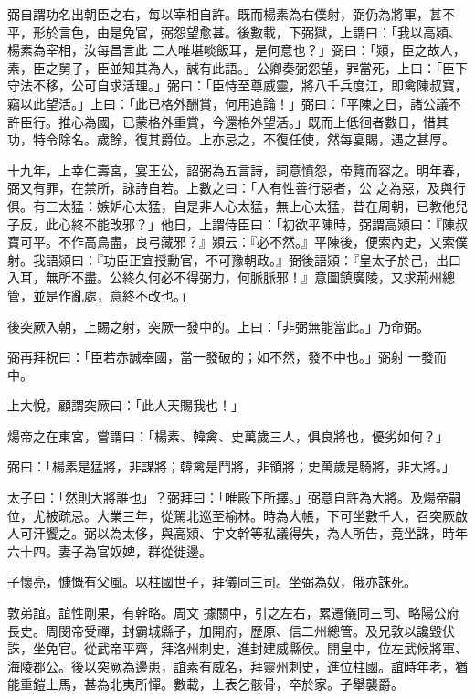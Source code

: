 \begin{pinyinscope}
 弼自謂功名出朝臣之右，每以宰相自許。既而楊素為右僕射，弼仍為將軍，甚不平，形於言色，由是免官，弼怨望愈甚。後數載，下弼獄，上謂曰：「我以高熲、楊素為宰相，汝每昌言此
 二人唯堪啖飯耳，是何意也？」弼曰：「熲，臣之故人，素，臣之舅子，臣並知其為人，誠有此語。」公卿奏弼怨望，罪當死，上曰：「臣下守法不移，公可自求活理。」弼曰：「臣恃至尊威靈，將八千兵度江，即禽陳叔寶，竊以此望活。」上曰：「此已格外酬賞，何用追論！」弼曰：「平陳之日，諸公議不許臣行。推心為國，已蒙格外重賞，今還格外望活。」既而上低徊者數日，惜其功，特令除名。歲餘，復其爵位。上亦忌之，不復任使，然每宴賜，遇之甚厚。



 十九年，上幸仁壽宮，宴王公，詔弼為五言詩，詞意憤怨，帝覽而容之。明年春，弼又有罪，在禁所，詠詩自若。上數之曰：「人有性善行惡者，公
 之為惡，及與行俱。有三太猛：嫉妒心太猛，自是非人心太猛，無上心太猛，昔在周朝，已教他兒子反，此心終不能改邪？」他日，上謂侍臣曰：「初欲平陳時，弼謂高熲曰：『陳叔寶可平。不作高鳥盡，良弓藏邪？』熲云：『必不然。』平陳後，便索內史，又索僕射。我語熲曰：『功臣正宜授勳官，不可豫朝政。』弼後語熲：『皇太子於己，出口入耳，無所不盡。公終久何必不得弼力，何脈脈邪！』意圖鎮廣陵，又求荊州總管，並是作亂處，意終不改也。」



 後突厥入朝，上賜之射，突厥一發中的。上曰：「非弼無能當此。」乃命弼。



 弼再拜祝曰：「臣若赤誠奉國，當一發破的；如不然，發不中也。」弼射
 一發而中。



 上大悅，顧謂突厥曰：「此人天賜我也！」



 煬帝之在東宮，嘗謂曰：「楊素、韓禽、史萬歲三人，俱良將也，優劣如何？」



 弼曰：「楊素是猛將，非謀將；韓禽是鬥將，非領將；史萬歲是騎將，非大將。」



 太子曰：「然則大將誰也」？弼拜曰：「唯殿下所擇。」弼意自許為大將。及煬帝嗣位，尤被疏忌。大業三年，從駕北巡至榆林。時為大帳，下可坐數千人，召突厥啟人可汗饗之。弼以為太侈，與高熲、宇文幹等私議得失，為人所告，竟坐誅，時年六十四。妻子為官奴婢，群從徙邊。



 子懷亮，慷慨有父風。以柱國世子，拜儀同三司。坐弼為奴，俄亦誅死。



 敦弟誼。誼性剛果，有幹略。周文
 據關中，引之左右，累遷儀同三司、略陽公府長史。周閔帝受禪，封霸城縣子，加開府，歷原、信二州總管。及兄敦以讒毀伏誅，坐免官。從武帝平齊，拜洛州刺史，進封建威縣侯。開皇中，位左武候將軍、海陵郡公。後以突厥為邊患，誼素有威名，拜靈州刺史，進位柱國。誼時年老，猶能重鎧上馬，甚為北夷所憚。數載，上表乞骸骨，卒於家。子舉襲爵。




\end{pinyinscope}
